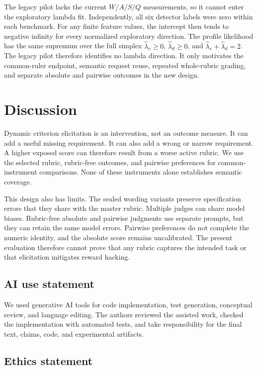 \documentclass{article} %
\begin{document}
The legacy pilot lacks the current $W/A/S/Q$ measurements, so
it cannot enter the exploratory lambda fit. Independently, all six detector
labels were zero within each benchmark. For any finite feature values, the
intercept then tends to negative infinity for every normalized exploratory
direction. The profile likelihood has the same supremum over the full simplex
$\widehat{\lambda}_v\geq0$, $\widehat{\lambda}_d\geq0$, and
$\widehat{\lambda}_v+\widehat{\lambda}_d=2$. The legacy pilot therefore
identifies no lambda direction. It only motivates the common-ruler endpoint,
semantic request reuse, repeated whole-rubric grading, and separate absolute and
pairwise outcomes in the new design.


\section{Discussion}

Dynamic criterion elicitation is an intervention, not an outcome measure. It
can add a useful missing requirement. It can also add a wrong or narrow
requirement. A higher exposed score can therefore result from a worse active
rubric. We use the selected rubric, rubric-free outcomes, and pairwise
preferences for common-instrument comparisons. None of these instruments alone
establishes semantic coverage.

This design also has limits. The sealed wording variants preserve specification errors that they share with the master rubric. Multiple judges can share model biases. Rubric-free absolute and pairwise judgments use separate prompts, but they can retain the same model errors. Pairwise preferences do not complete the numeric identity, and the absolute score remains uncalibrated. The present evaluation therefore cannot prove that any rubric captures the intended task or that elicitation mitigates reward hacking.

\subsection*{AI use statement}

We used generative AI tools for code implementation, test generation,
conceptual review, and language editing. The authors reviewed the assisted work,
checked the implementation with automated tests, and take responsibility for
the final text, claims, code, and experimental artifacts.

\subsection*{Ethics statement}
\end{document}
